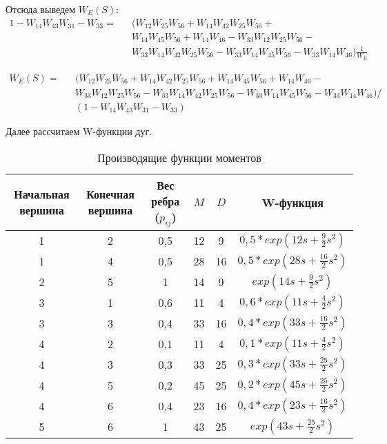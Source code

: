 Отсюда выведем $W_E(S)$:
\begin{eqnarray*}
	1 - W_{14}W_{43}W_{31} - W_{33} = && (W_{12}W_{25}W_{56} + W_{14}W_{42}W_{25}W_{56} + \\
	&& W_{14}W_{45}W_{56} + W_{14}W_{46} - W_{33}W_{12}W_{25}W_{56} - \\
	&& W_{33}W_{14}W_{42}W_{25}W_{56} - W_{33}W_{14}W_{45}W_{56} - W_{33}W_{14}W_{46})\frac{1}{W_E}
\end{eqnarray*}

\begin{eqnarray*}
	W_E(S) = && (W_{12}W_{25}W_{56} + W_{14}W_{42}W_{25}W_{56} + W_{14}W_{45}W_{56} + W_{14}W_{46} - \\
	&&W_{33}W_{12}W_{25}W_{56} - W_{33}W_{14}W_{42}W_{25}W_{56} - W_{33}W_{14}W_{45}W_{56} - W_{33}W_{14}W_{46})/ \\
	&&(1 - W_{14}W_{43}W_{31} - W_{33})
\end{eqnarray*}

Далее рассчитаем W-функции дуг.

\begin{table}[htb]
\centering
	\begin{tabular}{|c|c|c|c|c|c|}
	\hline 
	Начальная вершина & Конечная вершина & Вес ребра ($p_{ij}$) & $M$ & $D$ & W-функция \\ 
	\hline 
	1 & 2 & 0,5 & 12 & 9 & $0,5*exp(12s+\frac{9}{2}s^2)$ \\ 
	\hline 
	1 & 4 & 0,5 & 28 & 16 & $0,5*exp(28s+\frac{16}{2}s^2)$ \\ 
	\hline 
	2 & 5 & 1 & 14 & 9 & $exp(14s+\frac{9}{2}s^2)$ \\ 
	\hline 
	3 & 1 & 0,6 & 11 & 4 & $0,6*exp(11s+\frac{4}{2}s^2)$ \\ 
	\hline 
	3 & 3 & 0,4 & 33 & 16 & $0,4*exp(33s+\frac{16}{2}s^2)$ \\ 
	\hline 
	4 & 2 & 0,1 & 11 & 4 & $0,1*exp(11s+\frac{4}{2}s^2)$ \\ 
	\hline 
	4 & 3 & 0,3 & 33 & 25 & $0,3*exp(33s+\frac{25}{2}s^2)$ \\ 
	\hline 
	4 & 5 & 0,2 & 45 & 25 & $0,2*exp(45s+\frac{25}{2}s^2)$ \\ 
	\hline 
	4 & 6 & 0,4 & 23 & 16 & $0,4*exp(23s+\frac{16}{2}s^2)$ \\ 
	\hline 
	5 & 6 & 1 & 43 & 25 & $exp(43s+\frac{25}{2}s^2)$ \\ 
	\hline 
	\end{tabular} 
\caption{Производящие функции моментов}
\end{table}

